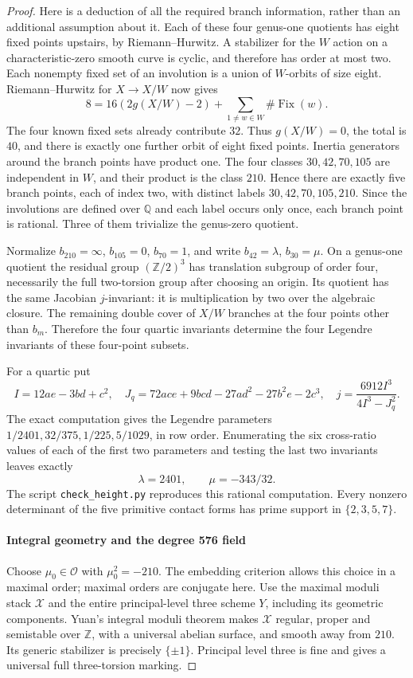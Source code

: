 \documentclass[11pt]{article}
\theoremstyle{definition}
\theoremstyle{remark}
\providecommand{\mathscr}[1]{\mathcal{#1}}
\begin{document}
\begin{proof}
Here is a deduction of all the required branch information, rather than
an additional assumption about it. Each of these four genus-one quotients
has eight fixed points upstairs, by Riemann--Hurwitz. A stabilizer for the
$W$ action on a characteristic-zero smooth curve is cyclic, and therefore
has order at most two. Each nonempty fixed set of an involution is a union
of $W$-orbits of size eight. Riemann--Hurwitz for $X\to X/W$ now gives
\[
 8=16(2g(X/W)-2)+\sum_{1\ne w\in W}\#\operatorname{Fix}(w).
\]
The four known fixed sets already contribute $32$. Thus $g(X/W)=0$,
the total is $40$, and there is exactly one further orbit of eight fixed
points. Inertia generators around the branch points have product one.
The four classes $30,42,70,105$ are independent in $W$, and their product
is the class $210$. Hence there are exactly five branch points, each of
index two, with distinct labels $30,42,70,105,210$. Since the involutions
are defined over $\mathbb Q$ and each label occurs only once, each branch
point is rational. Three of them trivialize the genus-zero quotient.

Normalize $b_{210}=\infty$, $b_{105}=0$, $b_{70}=1$, and write
$b_{42}=\lambda$, $b_{30}=\mu$. On a genus-one quotient the residual
group $(\mathbb Z/2)^3$ has translation subgroup of order four, necessarily
the full two-torsion group after choosing an origin. Its quotient has the
same Jacobian $j$-invariant: it is multiplication by two over the algebraic
closure. The remaining double cover of $X/W$ branches at the four points
other than $b_m$. Therefore the four quartic invariants determine the four
Legendre invariants of these four-point subsets.

For a quartic put
\[
 I=12ae-3bd+c^2,\quad
 J_q=72ace+9bcd-27ad^2-27b^2e-2c^3,\quad
 j=\frac{6912I^3}{4I^3-J_q^2}.
\]
The exact computation gives the Legendre parameters
$1/2401,32/375,1/225,5/1029$, in row order. Enumerating the six cross-ratio
values of each of the first two parameters and testing the last two
invariants leaves exactly
\[
 \lambda=2401,\qquad\mu=-343/32.
\]
The script \texttt{check\_height.py} reproduces this rational computation.
Every nonzero determinant of the five primitive contact forms has prime
support in $\{2,3,5,7\}$.

\paragraph{Integral geometry and the degree 576 field}
Choose $\mu_0\in\mathcal O$ with $\mu_0^2=-210$. The embedding criterion
allows this choice in a maximal order; maximal orders are conjugate here.
Use the maximal moduli stack $\mathscr X$ and the entire principal-level
three scheme $Y$, including its geometric components. Yuan's integral
moduli theorem \cite[Theorem 1.1 and Sections 2.1--2.2]{Yuan2024} makes $\mathscr X$ regular, proper and semistable over
$\mathbb Z$, with a universal abelian surface, and smooth away from $210$.
Its generic stabilizer is precisely $\{\pm1\}$. Principal level three is
fine and gives a universal full three-torsion marking.


\end{proof}
\end{document}
